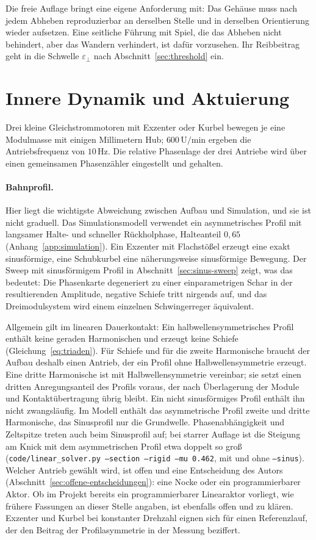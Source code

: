 \documentclass[12pt,a4paper]{report}
\begin{document}
Die freie Auflage bringt eine eigene Anforderung mit: Das Gehäuse muss
nach jedem Abheben reproduzierbar an derselben Stelle und in derselben
Orientierung wieder aufsetzen. Eine seitliche Führung mit Spiel, die
das Abheben nicht behindert, aber das Wandern verhindert, ist dafür
vorzusehen. Ihr Reibbeitrag geht in die Schwelle $\varepsilon_{\perp}$
nach Abschnitt~\ref{sec:threshold} ein.

\section{Innere Dynamik und Aktuierung}

Drei kleine Gleichstrommotoren mit Exzenter oder Kurbel bewegen je eine
Modulmasse mit einigen Millimetern Hub; $600\,\mathrm{U/min}$ ergeben die
Antriebsfrequenz von $10\,\mathrm{Hz}$. Die relative Phasenlage der drei
Antriebe wird über einen gemeinsamen Phasenzähler eingestellt und
gehalten.

\paragraph{Bahnprofil.}
Hier liegt die wichtigste Abweichung zwischen Aufbau und Simulation, und
sie ist nicht graduell. Das Simulationsmodell verwendet ein
asymmetrisches Profil mit langsamer Halte- und schneller Rückholphase,
Halteanteil $0{,}65$ (Anhang~\ref{app:simulation}). Ein Exzenter mit
Flachstößel erzeugt eine exakt sinusförmige, eine Schubkurbel eine
näherungsweise sinusförmige Bewegung. Der Sweep mit sinusförmigem Profil
in Abschnitt~\ref{sec:sinus-sweep} zeigt, was das bedeutet: Die
Phasenkarte degeneriert zu einer einparametrigen Schar in der
resultierenden Amplitude, negative Schiefe tritt nirgends auf, und das
Dreimodulsystem wird einem einzelnen Schwingerreger äquivalent.

Allgemein gilt im linearen Dauerkontakt: Ein halbwellensymmetrisches
Profil enthält keine geraden Harmonischen und erzeugt keine Schiefe
(Gleichung~\eqref{eq:triaden}). Für Schiefe und für die zweite
Harmonische braucht der Aufbau deshalb einen Antrieb, der ein Profil
ohne Halbwellensymmetrie erzeugt. Eine dritte Harmonische ist mit
Halbwellensymmetrie vereinbar; sie setzt einen dritten Anregungsanteil
des Profils voraus, der nach Überlagerung der Module und
Kontaktübertragung übrig bleibt. Ein nicht sinusförmiges Profil enthält
ihn nicht zwangsläufig. Im Modell enthält das asymmetrische Profil zweite
und dritte Harmonische, das Sinusprofil nur die Grundwelle.
Phasenabhängigkeit und Zeltspitze treten
auch beim Sinusprofil auf; bei starrer Auflage ist die Steigung am Knick
mit dem asymmetrischen Profil etwa doppelt so groß
(\texttt{code/linear\_solver.py --section --rigid --mu 0.462}, mit und
ohne \texttt{--sinus}). Welcher Antrieb gewählt wird, ist offen und eine
Entscheidung des Autors (Abschnitt~\ref{sec:offene-entscheidungen}): eine
Nocke oder ein programmierbarer Aktor. Ob im Projekt bereits ein
programmierbarer Linearaktor vorliegt, wie frühere Fassungen an dieser
Stelle angaben, ist ebenfalls offen und zu klären. Exzenter und Kurbel
bei konstanter Drehzahl eignen sich für einen Referenzlauf, der den
Beitrag der Profilasymmetrie in der Messung beziffert.
\end{document}
